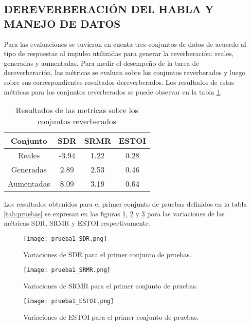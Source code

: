 \subsection[Dereverberación del habla y manejo de datos]{DEREVERBERACIÓN DEL HABLA Y MANEJO DE DATOS}

Para las evaluaciones se tuvieron en cuenta tres conjuntos de datos de acuerdo al tipo de respuestas al impulso utilizadas para generar la reverberación: reales, generadas y aumentadas. Para medir el desempeño de la tarea de dereverberación, las métricas se evaluan sobre los conjuntos reverberados y luego sobre sus correspondientes resultados dereverberados. Los resultados de estas métricas para los conjuntos reverberados se puede observar en la tabla \ref{table:resultados_reverb}. 

\begin{table}[H]
\centering
\caption{Resultados de las metricas sobre los conjuntos reverberados}
\begin{tabular}{|c|c|c|c|}
\hline
Conjunto   & \textbf{SDR} & \textbf{SRMR} & \textbf{ESTOI} \\ \hline
Reales     & -3.94        & 1.22          & 0.28           \\
Generadas  & 2.89        & 2.53          & 0.46           \\
Aumentadas & 8.09        & 3.19          & 0.64           \\ \hline
\end{tabular}
\label{table:resultados_reverb}
\end{table}


Los resultados obtenidos para el primer conjunto de pruebas definidos en la tabla \ref{tab:pruebas} se expresan en las figuras \ref{fig:1_SDR}, \ref{fig:1_SRMR} y \ref{fig:1_ESTOI} para las variaciones de las métricas SDR, SRMR y ESTOI respectivamente. 

\begin{figure}[H]
	\centering{}
	\texttt{[image: prueba1\_SDR.png]}
	\caption{Variaciones de SDR para el primer conjunto de pruebas.}
	\label{fig:1_SDR}
\end{figure}

\begin{figure}[H]
	\centering{}
	\texttt{[image: prueba1\_SRMR.png]}
	\caption{Variaciones de SRMR para el primer conjunto de pruebas.}
	\label{fig:1_SRMR}
\end{figure}

\begin{figure}[H]
	\centering{}
	\texttt{[image: prueba1\_ESTOI.png]}
	\caption{Variaciones de ESTOI para el primer conjunto de pruebas.}
	\label{fig:1_ESTOI}
\end{figure}

